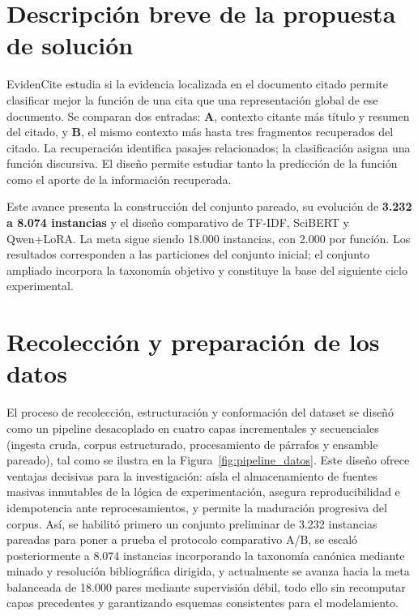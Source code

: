 \documentclass[10pt,a4paper,twocolumn]{article}
\begin{document}
\raggedbottom
{}

\section{Descripción breve de la propuesta de solución}
EvidenCite estudia si la evidencia localizada en el documento citado permite clasificar mejor la función de una cita que una representación global de ese documento. Se comparan dos entradas: \textbf{A}, contexto citante más título y resumen del citado, y \textbf{B}, el mismo contexto más hasta tres fragmentos recuperados del citado. La recuperación identifica pasajes relacionados; la clasificación asigna una función discursiva. El diseño permite estudiar tanto la predicción de la función como el aporte de la información recuperada.

Este avance presenta la construcción del conjunto pareado, su evolución de \textbf{3.232 a 8.074 instancias} y el diseño comparativo de TF-IDF, SciBERT y Qwen+LoRA. La meta sigue siendo 18.000 instancias, con 2.000 por función. Los resultados corresponden a las particiones del conjunto inicial; el conjunto ampliado incorpora la taxonomía objetivo y constituye la base del siguiente ciclo experimental.

\section{Recolección y preparación de los datos}
El proceso de recolección, estructuración y conformación del dataset se diseñó como un pipeline desacoplado en cuatro capas incrementales y secuenciales (ingesta cruda, corpus estructurado, procesamiento de párrafos y ensamble pareado), tal como se ilustra en la Figura~\ref{fig:pipeline_datos}. Este diseño ofrece ventajas decisivas para la investigación: aísla el almacenamiento de fuentes masivas inmutables de la lógica de experimentación, asegura reproducibilidad e idempotencia ante reprocesamientos, y permite la maduración progresiva del corpus. Así, se habilitó primero un conjunto preliminar de 3.232 instancias pareadas para poner a prueba el protocolo comparativo A/B, se escaló posteriormente a 8.074 instancias incorporando la taxonomía canónica mediante minado y resolución bibliográfica dirigida, y actualmente se avanza hacia la meta balanceada de 18.000 pares mediante supervisión débil, todo ello sin recomputar capas precedentes y garantizando esquemas consistentes para el modelamiento.
\end{document}
